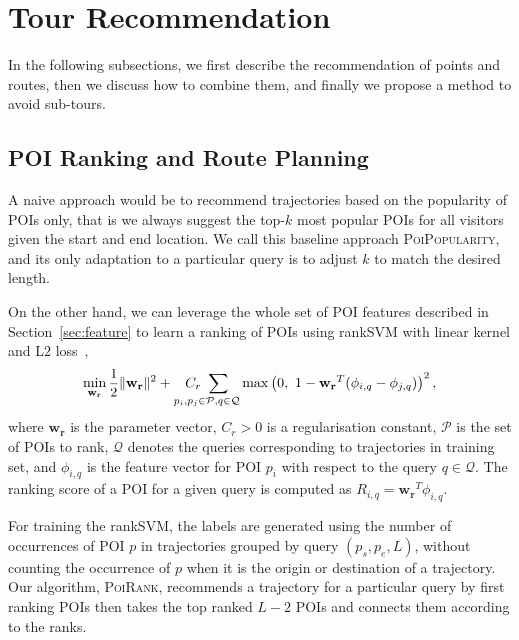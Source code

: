 
\secmoveup
\section{Tour Recommendation}
\label{sec:recommendation}

In the following subsections, we first describe the recommendation of points and routes,
then we discuss how to combine them, and finally we propose a method to avoid sub-tours.

\secmoveup
\subsection{POI Ranking and Route Planning}
\label{sec:rankplan}

A naive approach would be to recommend trajectories based on the popularity of POIs only,
that is we always suggest the top-$k$ most popular POIs for all visitors given the start and end location.
We call this baseline approach \textsc{PoiPopularity},
and its only adaptation to a particular query is to adjust $k$ to match the desired length.

On the other hand, we can leverage the whole set of POI features described in Section~\ref{sec:feature}
to learn a ranking of POIs using rankSVM with linear kernel and L$2$ loss~\cite{lranksvm},
\eqmoveup
\begin{equation*}
\eqmoveup
\min_{\mathbf{w_r}} \frac{1}{2}
                     \|\mathbf{w_r}\|^2 +
                    \underset{p_i, p_j \in \mathcal{P}, q \in \mathcal{Q}}{C_r ~\sum}
                    \max \left( 0,~ 1 - \mathbf{w_r}^T (\phi_{i,q} - \phi_{j,q}) \right)^2,
\end{equation*}
where $\mathbf{w_r}$ is the parameter vector,
$C_r > 0$ is a regularisation constant,
$\mathcal{P}$ is the set of POIs to rank,
$\mathcal{Q}$ denotes the queries corresponding to trajectories in training set,
and $\phi_{i,q}$ is the feature vector for POI $p_i$ with respect to the query $q \in \mathcal{Q}$. 
The ranking score of a POI for a given query is computed as $R_{i,q} =\mathbf{w_r}^T \phi_{i,q}$. 

For training the rankSVM, the labels are generated using the number of occurrences of
POI $p$ in trajectories grouped by query $(p_s, p_e, L)$,
without counting the occurrence of $p$ when it is the origin or destination of a trajectory.
Our algorithm, \textsc{PoiRank}, recommends a trajectory for a particular query
by first ranking POIs
then takes the top ranked $L-2$ POIs and connects them according to the ranks.



